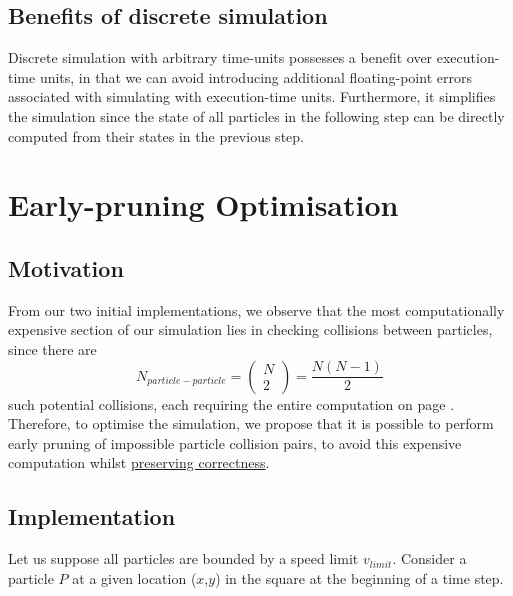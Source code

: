 \documentclass[12pt]{article}
\begin{document}
\subsection{Benefits of discrete simulation}

Discrete simulation with arbitrary time-units possesses a benefit over execution-time units, in that we can avoid introducing additional floating-point errors associated with simulating with execution-time units. Furthermore, it simplifies the simulation since the state of all particles in the following step can be directly computed from their states in the previous step.

\pagebreak

\section{Early-pruning Optimisation}

\subsection{Motivation}

From our two initial implementations, we observe that the most computationally expensive section of our simulation lies in checking collisions between particles, since there are
$$ N_{particle-particle} = \begin{pmatrix} N \\ 2 \end{pmatrix} = \frac{N(N-1)}{2}$$
such potential collisions, each requiring the entire computation on page \pageref{trajectory-calc}. \\

Therefore, to optimise the simulation, we propose that it is possible to perform early pruning of impossible particle collision pairs, to avoid this expensive computation whilst \ul{preserving correctness}.

\subsection{Implementation}

Let us suppose all particles are bounded by a speed limit $v_{limit}$. Consider a particle $P$ at a given location ($x$,$y$) in the square at the beginning of a time step. \\
\end{document}
